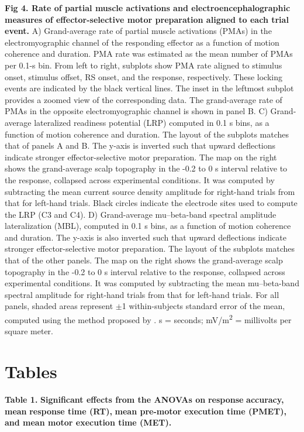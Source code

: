 \textbf{Fig 4. Rate of partial muscle activations and electroencephalographic measures of effector-selective motor preparation aligned to each trial event}\textbf{.}  A) Grand-average rate of partial muscle activations (PMAs) in the electromyographic channel of the responding effector as a function of motion coherence and duration. PMA rate was estimated as the mean number of PMAs per 0.1-s bin.  From left to right, subplots show PMA rate aligned to stimulus onset, stimulus offset, RS onset, and the response, respectively. These locking events are indicated by the black vertical lines. The inset in the leftmost subplot provides a zoomed view of the corresponding data. The grand-average rate of PMAs in the opposite electromyographic channel is shown in panel B. C) Grand-average lateralized readiness potential (LRP)  computed in 0.1 s bins, as a function of motion coherence and duration. The layout of the subplots matches that of panels A and B.  The y-axis is inverted such that upward deflections indicate stronger effector-selective motor preparation. The map on the right shows the grand-average scalp topography in the -0.2 to 0 s interval relative to the response, collapsed across experimental conditions. It was computed by subtracting the mean current source density amplitude for right-hand trials from that for left-hand trials. Black circles indicate the electrode sites used to compute the LRP (C3 and C4). D) Grand-average mu--beta-band spectral amplitude lateralization (MBL), computed in 0.1 s bins, as a function of motion coherence and duration. The y-axis is also inverted such that upward deflections indicate stronger effector-selective motor preparation.  The layout of the subplots matches that of the other panels.  The map on the right shows the grand-average scalp topography in the -0.2 to 0 s interval relative to the response, collapsed across experimental conditions. It was computed by subtracting the mean mu--beta-band spectral amplitude for right-hand trials from that for left-hand trials. For all panels, shaded areas represent $\pm$1 within-subjects standard error of the mean, computed using the method proposed by \textcite{moreyConfidenceIntervalsNormalized2008}.  s = seconds; mV/m\textsuperscript{2} = millivolts per square meter.


\section{Tables}

\textbf{Table 1.} \textbf{S}\textbf{ignificant effects from the ANOVAs on}  \textbf{response} \textbf{accuracy, mean} \textbf{response time (}\textbf{RT}\textbf{)}\textbf{,} \textbf{mean pre-motor execution time (PMET), and mean motor execution time (}\textbf{MET}\textbf{)}\textbf{.}

